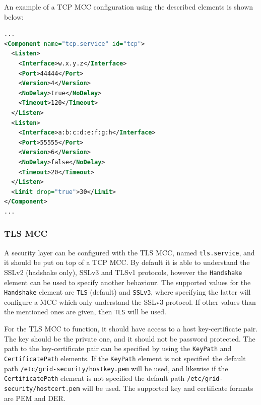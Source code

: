 \documentclass{article}
\begin{document}
An example of a TCP MCC configuration using the described elements is shown
below:
\begin{lstlisting}[language=xml]
...
<Component name="tcp.service" id="tcp">
  <Listen>
    <Interface>w.x.y.z</Interface>
    <Port>44444</Port>
    <Version>4</Version>
    <NoDelay>true</NoDelay>
    <Timeout>120</Timeout>
  </Listen>
  <Listen>
    <Interface>a:b:c:d:e:f:g:h</Interface>
    <Port>55555</Port>
    <Version>6</Version>
    <NoDelay>false</NoDelay>
    <Timeout>20</Timeout>
  </Listen>
  <Limit drop="true">30</Limit>
</Component>
...
\end{lstlisting}

\subsubsection{TLS MCC}\label{sec:tls-mcc}
A security layer can be configured with the TLS MCC, named \texttt{tls.service},
and it should be put on top of a TCP MCC. By default it is able to understand
the SSLv2 (hadshake only), SSLv3 and TLSv1 protocols, however the \texttt{Handshake}
element can be used to specify another behaviour. The supported values for the
\texttt{Handshake} element are \texttt{TLS} (default) and \texttt{SSLv3}, where
specifying the latter will configure a MCC which only understand the SSLv3
protocol. If other values than the mentioned ones are given, then \texttt{TLS}
will be used.

For the TLS MCC to function, it should have access to a host key-certificate
pair. The key should be the private one, and it should not be password
protected. The path to the key-certificate pair can be specified by using the
\texttt{KeyPath} and \texttt{CertificatePath} elements. If the \texttt{KeyPath}
element is not specified the default path
\texttt{/etc/grid-security/hostkey.pem} will be used, and likewise if the
\texttt{CertificatePath} element is not specified the default path
\texttt{/etc/grid-security/hostcert.pem} will be used. The supported key and
certificate formats are PEM and DER.
\end{document}
